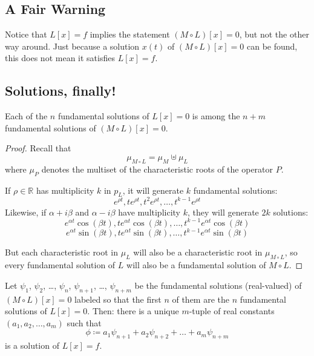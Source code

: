 \documentclass[12pt]{article}
\begin{document}
\subsection{A Fair Warning}
Notice that $L[x] = f$ implies the statement $(M\circ L)[x] = 0$, but not the other way around. Just because a solution $x(t)$ of $(M \circ L)[x] = 0$ can be found, this does not mean it satisfies $L[x] = f$.

\subsection{Solutions, finally!}
\begin{theorem}
Each of the $n$ fundamental solutions of $L[x] = 0$ is among the $n+m$ fundamental solutions of $(M \circ L)[x] = 0$. 
\end{theorem}

\begin{proof}
Recall that \[ \mu_{M\circ L} = \mu_M \uplus \mu_L \] where $\mu_P$ denotes the multiset of the characteristic roots of the operator $P$.

If $\rho \in \mathbb{R}$ has multiplicity $k$ in $p_L$, it will generate $k$ fundamental solutions:
\[ e^{\rho t}, te^{\rho t}, t^2e^{\rho t}, \dots, t^{k-1}e^{\rho t} \]
Likewise, if $\alpha + i\beta$ and $\alpha - i\beta$ have multiplicity $k$, they will generate $2k$ solutions:
\[ e^{\alpha t}\cos(\beta t), te^{\alpha t}\cos(\beta t), \dots, t^{k-1}e^{\alpha t}\cos(\beta t) \]
\[ e^{\alpha t}\sin(\beta t), te^{\alpha t}\sin(\beta t), \dots, t^{k-1}e^{\alpha t}\sin(\beta t) \]

But each characteristic root in $\mu_L$ will also be a characteristic root in $\mu_{M \circ L}$, so every fundamental solution of $L$ will also be a fundamental solution of $M \circ L$.
\end{proof}

\begin{theorem}
Let $\psi_1$, $\psi_2$, \dots, $\psi_n$, $\psi_{n+1}$, \dots, $\psi_{n+m}$ be the fundamental solutions (real-valued) of $(M \circ L)[x] = 0$ labeled so that the first $n$ of them are the $n$ fundamental solutions of $L[x] = 0$. Then: there is a unique $m$-tuple of real constants $(a_1,a_2,\dots,a_m)$ such that \[ \phi \coloneqq a_1\psi_{n+1} + a_2\psi_{n+2} + \dots + a_m\psi_{n+m} \] is a solution of $L[x] = f$.
\end{theorem}
\end{document}
